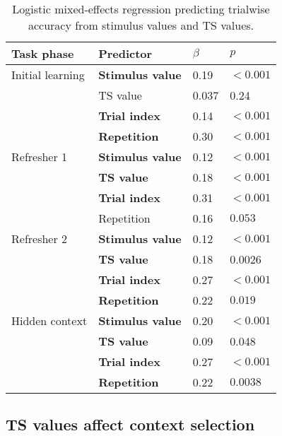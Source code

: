 \documentclass[10pt, letterpaper]{article}
\begin{document}
\begin{table}[!ht]
\begin{center} 
\caption{Logistic mixed-effects regression predicting trialwise accuracy from stimulus values and TS values.} 
\label{table:accuracy} 
\vskip 0.1in
\small{
\begin{tabular}{llll} 
\hline
Task phase          &   Predictor               &   $\beta$ &   $p$ \\
\hline
Initial learning    &   {\bf Stimulus value}    &   0.19    &   $<0.001$ \\
                    &   TS value                &   0.037   &   0.24     \\
                    &   {\bf Trial index}       &   0.14    &   $<0.001$ \\
                    &   {\bf Repetition}        &   0.30    &   $<0.001$ \\
Refresher 1         &   {\bf Stimulus value}    &   0.12    &   $<0.001$ \\
                    &   {\bf TS value}          &   0.18    &   $<0.001$ \\
                    &   {\bf Trial index}       &   0.31    &   $<0.001$ \\
                    &   Repetition              &   0.16    &   $0.053$  \\
Refresher 2         &   {\bf Stimulus value}    &   0.12    &   $<0.001$ \\
                    &   {\bf TS value}          &   0.18    &   0.0026   \\
                    &   {\bf Trial index}       &   0.27    &   $<0.001$ \\
                    &   {\bf Repetition}        &   0.22    &   $0.019$  \\
Hidden context      &   {\bf Stimulus value}    &   0.20    &   $<0.001$ \\
                    &   {\bf TS value}          &   0.09    &   0.048    \\
                    &   {\bf Trial index}       &   0.27    &   $<0.001$ \\
                    &   {\bf Repetition}        &   0.22    &   $0.0038$ \\
\hline
\end{tabular}
}
\end{center} 
\end{table}


\subsection{TS values affect context selection}
\end{document}
